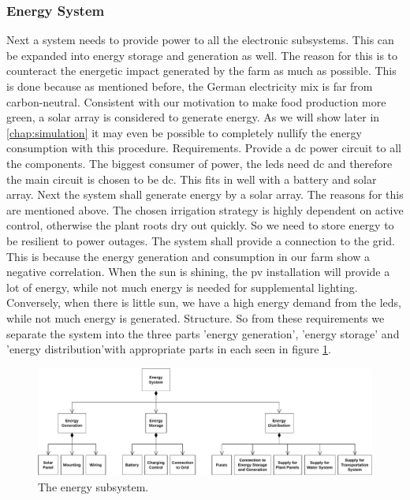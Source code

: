 \subsubsection{Energy System}
Next a system needs to provide power to all the electronic subsystems.
This can be expanded into energy storage and generation as well.
The reason for this is to counteract the energetic impact generated by the farm as much as possible.
This is done because as mentioned before, the German electricity mix is far from carbon-neutral.
Consistent with our motivation to make food production more green, a solar array is considered to generate energy.
As we will show later in \ref{chap:simulation} it may even be possible to completely nullify the energy consumption with this procedure.
Requirements.
Provide a \ac{dc} power circuit to all the components.
The biggest consumer of power, the \acp{led} need \ac{dc} and therefore the main circuit is chosen to be \ac{dc}.
This fits in well with a battery and solar array.
Next the system shall generate energy by a solar array.
The reasons for this are mentioned above.
The chosen irrigation strategy is highly dependent on active control, otherwise the plant roots dry out quickly.
So we need to store energy to be resilient to power outages.
The system shall provide a connection to the grid.
This is because the energy generation and consumption in our farm show a negative correlation.
When the sun is shining, the \ac{pv} installation will provide a lot of energy, while not much energy is needed for supplemental lighting.
Conversely, when there is little sun, we have a high energy demand from the \acp{led}, while not much energy is generated.
Structure.
So from these requirements we separate the system into the three parts 'energy generation', 'energy storage' and 'energy distribution'with appropriate parts in each seen in figure \ref{fig:energy}.

\begin{figure}[htbp]
  \centering
  \caption{The energy subsystem.}
  \label{fig:energy}
  \includegraphics[width=\textwidth]{img/architecture/energy.pdf}
\end{figure}


